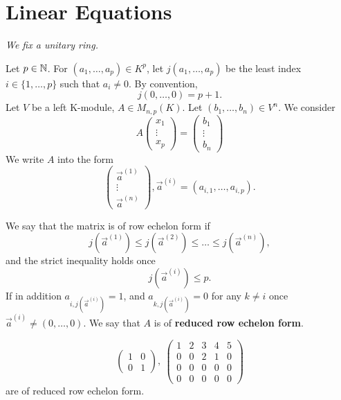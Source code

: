 \documentclass{book}
\numberwithin{equation}{section}
\begin{document}
\section{Linear Equations}
{\large\textit{We fix a unitary ring.}}
\begin{definitionenv}
    Let $p\in \mathbb{N}$. For $(a_1,\dots,a_p)\in K^p$, let $j(a_1,\dots,a_p)$ be the least index $i\in\{1,\dots,p\}$ such that $a_i\not=0$. By convention,
    $$j(0,\dots,0)=p+1.$$
    Let $V$ be a left K-module, $A\in M_{n,p}(K)$. Let $(b_1,\dots , b_n)\in V^n$. We consider
\begin{equation*}
A\begin{pmatrix}
 x_1\\
 \vdots\\
x_p
\end{pmatrix}=\begin{pmatrix}
 b_1\\
 \vdots\\
b_n
\end{pmatrix}\tag{$*$}
\end{equation*}
We write $A$ into the form
$$\begin{pmatrix}
 \vec{a}^{(1)} \\
 \vdots\\
 \vec{a}^{(n)}
\end{pmatrix}, \vec{a}^{(i)}=(a_{i,1},\dots,a_{i,p}).$$
\end{definitionenv}
\begin{definitionenv}
    We say that the matrix is of row echelon form if 
    $$j\left(\vec{a}^{(1)}\right)\le j\left(\vec{a}^{(2)}\right)\le \dots\le j\left(\vec{a}^{(n)}\right),$$
    and the strict inequality holds once $$j\left(\vec{a}^{(i)}\right)\le p.$$
    If in addition $a_{i,j\left(\vec{a}^{(i)}\right)}=1$,  and $a_{k,j\left(\vec{a}^{(i)}\right)}=0$ for any $k\not=i$ once $\vec{a}^{(i)}\not=(0,\dots,0)$. We say that $A$ is of \textbf{reduced row echelon form}. 
\end{definitionenv}
\begin{exampleenv}
    $$
    \begin{pmatrix}
        1&0\\
        0&1
    \end{pmatrix},\ 
\begin{pmatrix}
  1&2  &3  &4  &5 \\
  0& 0 &2  &1  &0 \\
  0& 0 &0  & 0 &0 \\
  0& 0 &  0&  0&0
\end{pmatrix}$$ are of reduced row echelon form.
\end{exampleenv}
\end{document}
